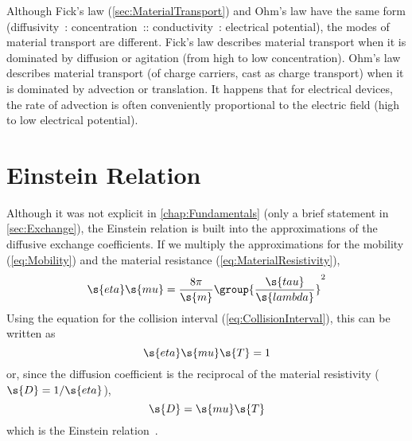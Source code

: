 Although Fick's law (\autoref{sec:MaterialTransport}) and Ohm's law have the same form (diffusivity~: concentration~:: conductivity~: electrical potential), the modes of material transport are different.  Fick's law describes material transport when it is dominated by diffusion or agitation (from high to low concentration).  Ohm's law describes material transport (of charge carriers, cast as charge transport) when it is dominated by advection or translation.  It happens that for electrical devices, the rate of advection is often conveniently proportional to the electric field (high to low electrical potential).


\section{Einstein Relation}
\label{sec:EinsteinRelation}

Although it was not explicit in \autoref{chap:Fundamentals} (only a brief statement in \autoref{sec:Exchange}), the Einstein relation is built into the approximations of the diffusive exchange coefficients.  If we multiply the approximations for the mobility (\autoref{eq:Mobility}) and the material resistance (\autoref{eq:MaterialResistivity}),
\begin{equation}
  \s{eta}\s{mu} = \frac{8\pi}{\s{m}}\group{\frac{\s{tau}}{\s{lambda}}}^2
\end{equation}
Using the equation for the collision interval (\ref{eq:CollisionInterval}), this can be written as
\begin{equation}
  \s{eta}\s{mu}\s{T} = 1
\end{equation}
or, since the diffusion coefficient is the reciprocal of the material resistivity ($\s{D} = 1/\s{eta}$),
\begin{equation}
  \s{D} = \s{mu}\s{T}
\end{equation}
which is the Einstein relation~\cite{Ashcroft1976, Roulston1999}.

